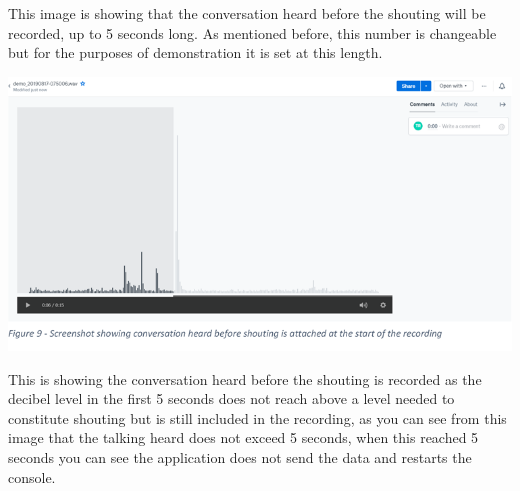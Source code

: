 \documentclass[a4paper,11pt]{report}
\begin{document}
This image is showing that the conversation heard before the shouting will be recorded, up to 5 seconds long. As mentioned before, this number is changeable but for the purposes of demonstration it is set at this length.\\
\begin{center}
\includegraphics{Screenshot4.PNG}
\end{center}

This is showing the conversation heard before the shouting is recorded as the decibel level in the first 5 seconds does not reach above a level needed to constitute shouting but is still included in the recording, as you can see from this image that the talking heard does not exceed 5 seconds, when this reached 5 seconds you can see the application does not send the data and restarts the console. \\
\end{document}

